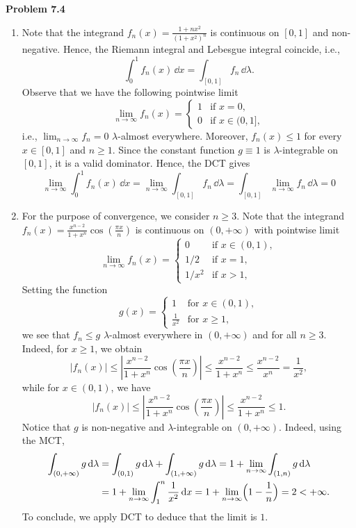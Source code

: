 \bigskip

\textbf{Problem 7.4}

\begin{enumerate}[label={(\alph*)}]
	\item Note that the integrand $f_n(x)=\frac{1+n x^2}{(1+x^2)^n}$ is continuous on $[0, 1]$ and non-negative. Hence, the Riemann integral and Lebesgue integral coincide, i.e.,
	\[
		\int_0^1 f_n(x)\,\dd x = \int_{[0,1]} f_n\,\dd\lambda.
	\] 
	Observe that we have the following pointwise limit
	\[
		\lim_{n\to\infty} f_n(x) = \begin{cases}
			1 &\text{if  $x=0$}, \\
			0 &\text{if $x\in (0,1]$},
		\end{cases}
	\]
	i.e., $\lim_{n\to\infty} f_n = 0$ $\lambda$-almost everywhere. Moreover, $f_n(x) \le 1$ for every $x\in[0,1]$ and $n\ge 1$. Since the constant function $g\equiv 1$ is $\lambda$-integrable on $[0,1]$, it is a valid dominator. Hence, the DCT gives
	\[
		\lim_{n\to\infty} \int_0^1 f_n(x)\,\dd x = \lim_{n\to\infty} \int_{[0,1]} f_n\,\dd \lambda = \int_{[0,1]} \lim_{n\to\infty} f_n\,\dd\lambda = 0
	\]
	
	\item For the purpose of convergence, we consider $n\ge 3$. Note that the integrand $f_n(x)=\frac{x^{n-2}}{1+x^n}\cos\left(\frac{\pi x}{n}\right)$ is continuous on $(0, +\infty)$ with pointwise limit
	\[
		\lim_{n\to\infty} f_n(x) = \begin{cases}
			0 & \text{if $x\in(0,1)$}, \\
			1/2 & \text{if $x=1$}, \\
			1/x^2 & \text{if $x>1$},
		\end{cases}
	\]
	Setting the function
	\[
		g(x) = \begin{cases}
			1 &\text{for $x\in(0,1)$},\\
			\frac{1}{x^2} &\text{for $x\ge 1$},
		\end{cases}
	\]
	we see that $f_n\le g$ $\lambda$-almost everywhere in $(0,+\infty)$ and for all $n\ge 3$. Indeed, for $x\ge 1$, we obtain
	\[
		|f_n(x)| \le \left| \frac{x^{n-2}}{1+x^n}\cos\left(\frac{\pi x}{n}\right)\right| \le \frac{x^{n-2}}{1+x^n} \le \frac{x^{n-2}}{x^n} =\frac{1}{x^2},
	\]
	while for $x\in(0,1)$, we have
	\[
		|f_n(x)| \le \left| \frac{x^{n-2}}{1+x^n}\cos\left(\frac{\pi x}{n}\right)\right| \le \frac{x^{n-2}}{1+x^n} \le 1.
	\]
	Notice that $g$ is non-negative and $\lambda$-integrable on $(0,+\infty)$. Indeed, using the MCT,
	\begin{align*}
		\int_{(0,+\infty)} g\,\mathrm{d}\lambda &= \int_{(0,1)} g\,\mathrm{d}\lambda + \int_{(1,+\infty)} g\,\mathrm{d}\lambda = 1 + \lim_{n\to\infty} \int_{(1,n)} g\,\mathrm{d}\lambda \\
		&= 1 + \lim_{n\to\infty} \int_1^n \frac{1}{x^2}\,\mathrm{d} x = 1 + \lim_{n\to\infty} \Bigl(1-\frac{1}{n} \Bigr) = 2 < +\infty.
	\end{align*}
	To conclude, we apply DCT to deduce that the limit is $1$.
	
\end{enumerate}

